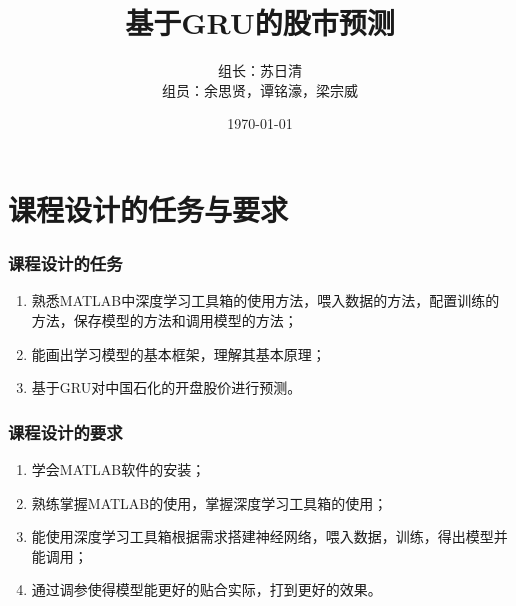 \documentclass[aspectratio=169, 10pt, utf8, mathserif]{beamer}
\begin{document}
	
	
	\title{基于GRU的股市预测}

	\author[余思贤]{组长：苏日清\\ 
		组员：余思贤，谭铭濠，梁宗威
		\quad \\ \vspace{0.5cm}  \quad{}}
	\institute[ ]
	{
		 
	}
	\date{\today}
	\begin{frame}
		\titlepage
	\end{frame}
	
	
\section{课程设计的任务与要求}


	\begin{frame}
		\frametitle{课程设计的任务}
\begin{enumerate}
	\item 熟悉MATLAB中深度学习工具箱的使用方法，喂入数据的方法，配置训练的方法，保存模型的方法和调用模型的方法；
	\item 能画出学习模型的基本框架，理解其基本原理；
	\item 基于GRU对中国石化的开盘股价进行预测。
\end{enumerate}
	\end{frame}

\begin{frame}
	\frametitle{课程设计的要求}
	\begin{enumerate}
		\zihao{3}
		\item 学会MATLAB软件的安装；
		\item 熟练掌握MATLAB的使用，掌握深度学习工具箱的使用；
		\item 能使用深度学习工具箱根据需求搭建神经网络，喂入数据，训练，得出模型并能调用；
		\item 通过调参使得模型能更好的贴合实际，打到更好的效果。
	\end{enumerate}
\end{frame}	
\end{document}
